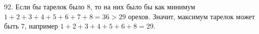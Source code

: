 92. Если бы тарелок было 8, то на них было бы как минимум $1+2+3+4+5+6+7+8=36>29$ орехов. Значит, максимум тарелок может быть 7, например $1+2+3+4+5+6+8=29.$\\
